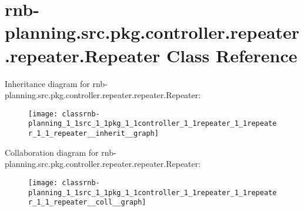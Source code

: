 \hypertarget{classrnb-planning_1_1src_1_1pkg_1_1controller_1_1repeater_1_1repeater_1_1_repeater}{}\section{rnb-\/planning.src.\+pkg.\+controller.\+repeater.\+repeater.\+Repeater Class Reference}
\label{classrnb-planning_1_1src_1_1pkg_1_1controller_1_1repeater_1_1repeater_1_1_repeater}


Inheritance diagram for rnb-\/planning.src.\+pkg.\+controller.\+repeater.\+repeater.\+Repeater\+:\nopagebreak
\begin{figure}[H]
\begin{center}
\leavevmode
\texttt{[image: classrnb-planning\_1\_1src\_1\_1pkg\_1\_1controller\_1\_1repeater\_1\_1repeater\_1\_1\_repeater\_\_inherit\_\_graph]}
\end{center}
\end{figure}


Collaboration diagram for rnb-\/planning.src.\+pkg.\+controller.\+repeater.\+repeater.\+Repeater\+:\nopagebreak
\begin{figure}[H]
\begin{center}
\leavevmode
\texttt{[image: classrnb-planning\_1\_1src\_1\_1pkg\_1\_1controller\_1\_1repeater\_1\_1repeater\_1\_1\_repeater\_\_coll\_\_graph]}
\end{center}
\end{figure}
